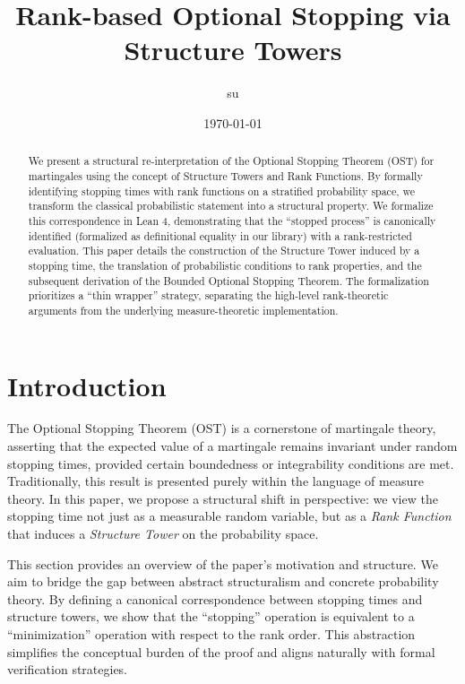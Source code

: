 \documentclass[11pt, a4paper]{article}
\title{Rank-based Optional Stopping via Structure Towers}
\author{su}
\date{\today}
\theoremstyle{plain}
\theoremstyle{definition}
\theoremstyle{remark}
\begin{document}
\maketitle

\begin{abstract}
We present a structural re-interpretation of the Optional Stopping Theorem (OST) for martingales using the concept of Structure Towers and Rank Functions. By formally identifying stopping times with rank functions on a stratified probability space, we transform the classical probabilistic statement into a structural property. We formalize this correspondence in Lean 4, demonstrating that the ``stopped process'' is canonically identified (formalized as definitional equality in our library) with a rank-restricted evaluation. This paper details the construction of the Structure Tower induced by a stopping time, the translation of probabilistic conditions to rank properties, and the subsequent derivation of the Bounded Optional Stopping Theorem. The formalization prioritizes a ``thin wrapper'' strategy, separating the high-level rank-theoretic arguments from the underlying measure-theoretic implementation.
\end{abstract}

\section{Introduction}

The Optional Stopping Theorem (OST) is a cornerstone of martingale theory, asserting that the expected value of a martingale remains invariant under random stopping times, provided certain boundedness or integrability conditions are met. Traditionally, this result is presented purely within the language of measure theory. In this paper, we propose a structural shift in perspective: we view the stopping time not just as a measurable random variable, but as a \textit{Rank Function} that induces a \textit{Structure Tower} on the probability space.

This section provides an overview of the paper's motivation and structure. We aim to bridge the gap between abstract structuralism and concrete probability theory. By defining a canonical correspondence between stopping times and structure towers, we show that the ``stopping'' operation is equivalent to a ``minimization'' operation with respect to the rank order. This abstraction simplifies the conceptual burden of the proof and aligns naturally with formal verification strategies.
\end{document}
